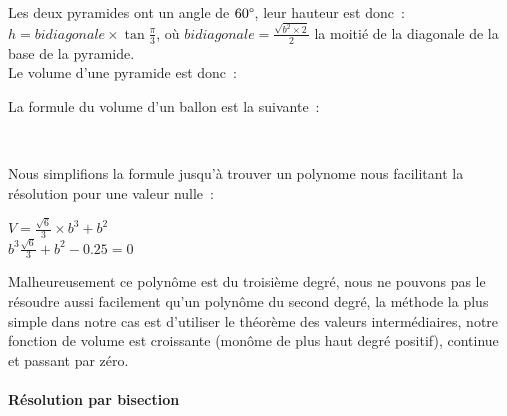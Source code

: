 \documentclass[a4paper,11pt]{article}
\begin{document}
Les deux pyramides ont un angle de $60 \degree$, leur hauteur est donc~: $\displaystyle{h = bidiagonale \times \tan{\frac{\pi}{3}}}$, où $\displaystyle{bidiagonale = \frac{\sqrt{b^2 \times 2}}{2}}$ la moitié de la diagonale de la base de la pyramide. \\
Le volume d'une pyramide est donc~:

\begin{center}
\end{center}

La formule du volume d'un ballon est la suivante~:

\begin{center}
	 \\
\end{center}

Nous simplifions la formule jusqu'à trouver un polynome nous facilitant la résolution pour une valeur nulle~:

\begin{center}
  $\displaystyle{V = \frac{\sqrt{6}}{3} \times b^3 + b^2 }$ \\
  $\displaystyle{b^3 \frac{\sqrt{6}}{3} + b^2 - 0.25 = 0}$
\end{center}

Malheureusement ce polynôme est du troisième degré, nous ne pouvons pas le résoudre aussi facilement qu'un polynôme du second degré, la méthode la plus simple dans notre cas est d'utiliser le théorème des valeurs intermédiaires, notre fonction de volume est croissante (monôme de plus haut degré positif), continue et passant par zéro.



\paragraph{Résolution par bisection}
\end{document}
